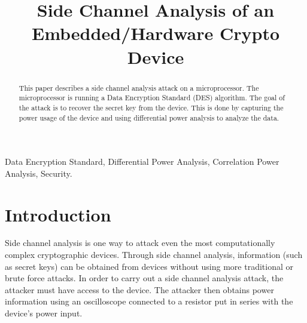 
\usepackage{tikz}
\usepackage{verbatim}
\usepackage{listings}


\title{Side Channel Analysis of an Embedded/Hardware Crypto Device}

\author{
}

\maketitle


\begin{abstract}
%
This paper describes a side channel analysis attack on a microprocessor.  The microprocessor is running a Data Encryption Standard (DES) algorithm.  The goal of the attack is to recover the secret key from the device.  This is done by capturing the power usage of the device and using differential power analysis to analyze the data. 
 
\end{abstract}

\begin{IEEEkeywords}
Data Encryption Standard, Differential Power Analysis, Correlation Power Analysis, Security.
\end{IEEEkeywords}

\section{Introduction}
	Side channel analysis is one way to attack even the most computationally complex cryptographic devices.  Through side channel analysis, information (such as secret keys) can be obtained from devices without using more traditional or brute force attacks.  In order to carry out a side channel analysis attack, the attacker must have access to the device.  The attacker then obtains power information using an oscilloscope connected to a resistor put in series with the device's power input.


